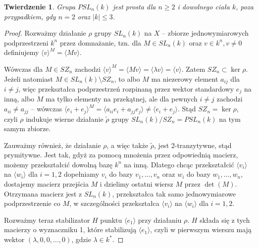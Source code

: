 \documentclass[licencjacka]{pracamgr}
\newtheorem{thh}{Twierdzenie}[section]
\begin{document}
\begin{thh}\label{PSL_simplicy}
  Grupa $PSL_n(k)$ jest prosta dla $n \ge 2$ i dowolnego ciała $k$, poza przypadkiem, gdy $n = 2$ oraz $|k| \le 3$.
\end{thh}
\begin{proof}
  Rozważmy działanie $\rho$ grupy $SL_n(k)$ na $X$ -- zbiorze jednowymiarowych podprzestrzeni $k^n$ przez domnażanie,
  tzn. dla $M \in SL_n(k)$ oraz $v \in k^n, v \ne 0$ definiujemy $\langle v \rangle ^ M = \langle Mv \rangle$.
  
  Wówczas dla $M \in SZ_n$ zachodzi $\langle v \rangle ^ M = \langle M v \rangle = \langle \lambda v \rangle = \langle v \rangle$.
  Zatem $SZ_n \subset \ker \rho$. Jeżeli natomiast $M \in SL_n(k) \setminus SZ_n$, to albo $M$ ma niezerowy element $a_{i j}$ dla $i \ne j$, 
  więc przekształca podprzestrzeń rozpinaną przez wektor standardowy $e_j$ na inną, albo $M$ ma tylko elementy na przekątnej, 
  ale dla pewnych $i \ne j$ zachodzi $a_{i i} \ne a_{j j}$ -- wówczas $\langle e_i + e_j \rangle^M = \langle a_{i i} e_i + a_{j j} e_j \rangle \ne \langle  e_i + e_j \rangle$.
  Stąd $SZ_n = \ker \rho$, czyli $\rho$ indukuje wierne działanie $\tilde{\rho}$ grupy $SL_n(k) / SZ_n = PSL_n(k)$ na tym samym zbiorze.

  Zauważmy również, że działanie $\rho$, a więc także $\tilde{\rho}$, jest 2-tranzytywne, stąd prymitywne.
  Jest tak, gdyż za pomocą mnożenia przez odpowiednią macierz, możemy przekształcić dowolną bazę $k^n$ na inną.
  Dlatego chcąc przekształcić $\langle v_i \rangle$ na $\langle w_i \rangle$ dla $i = 1, 2$ dopełniamy $v_i$ do bazy $v_1, \ldots, v_n$
  oraz $w_i$ do bazy $w_1, \ldots, w_n$, dostajemy macierz przejścia $M$ i dzielimy ostatni wiersz $M$ przez $\det(M)$.
  Otrzymana macierz jest z $SL_n(k)$, przekształca tak samo jednowymiarowe podprzestrzenie co $M$, w szczególności przekształca 
  $\langle v_i \rangle$ na $\langle w_i \rangle$ dla $i = 1, 2$.

  Rozważmy teraz stabilizator $H$ punktu $\langle e_1 \rangle$ przy działaniu $\rho$.
  $H$ składa się z tych macierzy o wyznaczniku 1, które stabilizują $\langle e_1 \rangle$,
  czyli w pierwszym wierszu mają wektor $(\lambda, 0, 0, \ldots, 0)$, gdzie $\lambda \in k^*$.


\end{proof}
\end{document}

